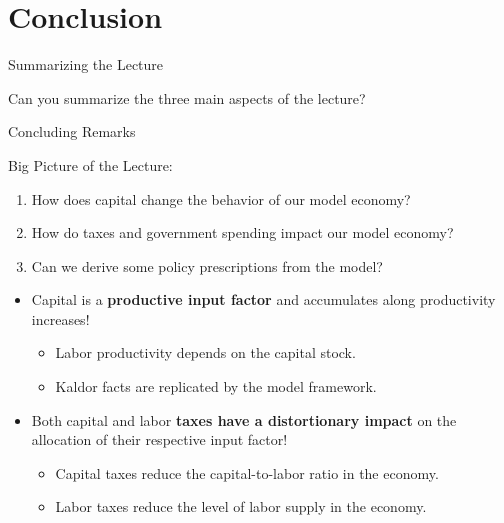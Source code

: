 \documentclass[10pt,c,aspectratio=1610,handout]{beamer}
\begin{document}
\section{Conclusion}%
\begin{frame}{Summarizing the Lecture}%
  \begin{center}%
    \begin{large}%
      Can you summarize the three main aspects of the lecture?%
    \end{large}%
  \end{center}%
\end{frame}%
\begin{frame}{Concluding Remarks}%
  \begin{block}{Big Picture of the Lecture:}%
    \begin{enumerate}%
      \item How does capital change the behavior of our model economy?%
      \item How do taxes and government spending impact our model economy?%
      \item Can we derive some policy prescriptions from the model?%
    \end{enumerate}%
  \end{block}%
  \pause%
  \begin{itemize}%
    \item[$\blacktriangleright$] Capital is a \textbf{productive input factor} and accumulates along productivity increases!%
    \begin{itemize}%
      \item[$\rightarrow$] Labor productivity depends on the capital stock.%
      \item[$\rightarrow$] Kaldor facts are replicated by the model framework.%
    \end{itemize}%
    \vspace*{0.1in}%
    \pause%
    \item[$\blacktriangleright$] Both capital and labor \textbf{taxes have a distortionary impact} on the allocation of their respective input factor!%
    \begin{itemize}%
      \item[$\rightarrow$] Capital taxes reduce the capital-to-labor ratio in the economy.%
      \item[$\rightarrow$] Labor taxes reduce the level of labor supply in the economy.%

\end{itemize}
\end{itemize}
\end{frame}
\end{document}
